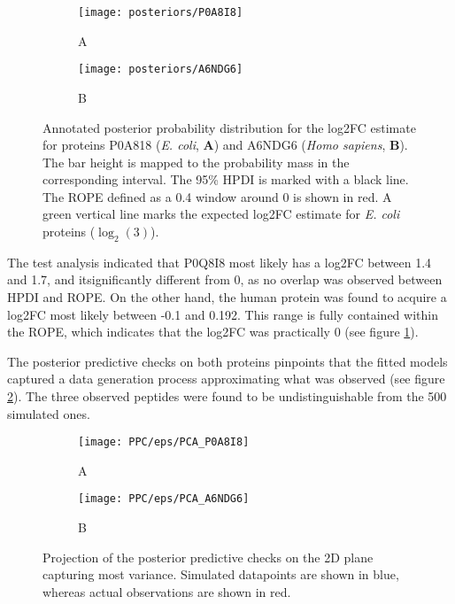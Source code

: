 \begin{figure}[!h]
\centering
\begin{subfigure}{0.8\textwidth}
\caption*{A}
\texttt{[image: posteriors/P0A8I8]}
\end{subfigure}
\bigskip
\begin{subfigure}{0.8\textwidth}
\caption*{B}
\texttt{[image: posteriors/A6NDG6]}
\end{subfigure}
\caption{Annotated posterior probability distribution for the \ac{log2FC} estimate for proteins P0A818 (\textit{E. coli}, \textbf{A}) and A6NDG6 (\textit{Homo sapiens}, \textbf{B}). The bar height is mapped to the probability mass in the corresponding interval. The 95\% \ac{HPDI} is marked with a black line. The \ac{ROPE} defined as a 0.4 window around 0 is shown in red. A green vertical line marks the expected \ac{log2FC} estimate for \textit{E. coli} proteins ($\log_2(3)$).}
\label{fig:posteriors}
\end{figure}

The test analysis indicated that P0Q8I8 most likely has a \ac{log2FC} between 1.4 and 1.7, and it\textquotesingle significantly different from 0, as no overlap was observed between \ac{HPDI} and \ac{ROPE}. On the other hand, the human protein was found to acquire a \ac{log2FC} most likely between -0.1 and 0.192. This range is fully contained within the \ac{ROPE}, which indicates that the \ac{log2FC} was practically 0 (see figure \ref{fig:posteriors}).


The posterior predictive checks on both proteins pinpoints that the fitted models captured a data generation process approximating what was observed (see figure \ref{fig:ppc}). The three observed peptides were found to be undistinguishable from the 500 simulated ones.

\begin{figure}[!h]
\centering
\begin{subfigure}{0.8\textwidth}
\caption*{A}
\texttt{[image: PPC/eps/PCA\_P0A8I8]}
\end{subfigure}
\bigskip
\begin{subfigure}{0.8\textwidth}
\caption*{B}
\texttt{[image: PPC/eps/PCA\_A6NDG6]}
\end{subfigure}
\caption{Projection of the posterior predictive checks on the 2D plane capturing most variance. Simulated datapoints are shown in blue, whereas actual observations are shown in red.}
\label{fig:ppc}
\end{figure}


